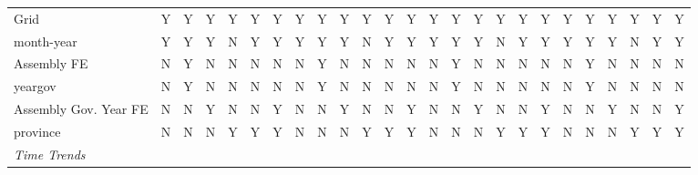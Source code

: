 \begin{table}[htbp]
\begin{tabular}{lcccccccccccccccccccccccc}
      Grid                      & Y          & Y             & Y             & Y             & Y             & Y             & Y           & Y             & Y             & Y             & Y             & Y            & Y            & Y            & Y           & Y             & Y             & Y            & Y         & Y         & Y         & Y             & Y         & Y\\  
      month-year                & Y          & Y             & Y             & N             & Y             & Y             & Y           & Y             & Y             & N             & Y             & Y            & Y            & Y            & Y           & N             & Y             & Y            & Y         & Y         & Y         & N             & Y         & Y\\  
      Assembly FE               & N          & Y             & N             & N             & N             & N             & N           & Y             & N             & N             & N             & N            & N            & Y            & N           & N             & N             & N            & N         & Y         & N         & N             & N         & N\\  
      yeargov                   & N          & Y             & N             & N             & N             & N             & N           & Y             & N             & N             & N             & N            & N            & Y            & N           & N             & N             & N            & N         & Y         & N         & N             & N         & N\\  
      Assembly Gov. Year FE     & N          & N             & Y             & N             & N             & Y             & N           & N             & Y             & N             & N             & Y            & N            & N            & Y           & N             & N             & Y            & N         & N         & Y         & N             & N         & Y\\  
      province                  & N          & N             & N             & Y             & Y             & Y             & N           & N             & N             & Y             & Y             & Y            & N            & N            & N           & Y             & Y             & Y            & N         & N         & N         & Y             & Y         & Y\\  
      \midrule \emph{Time Trends}\\

\end{tabular}
\end{table}
